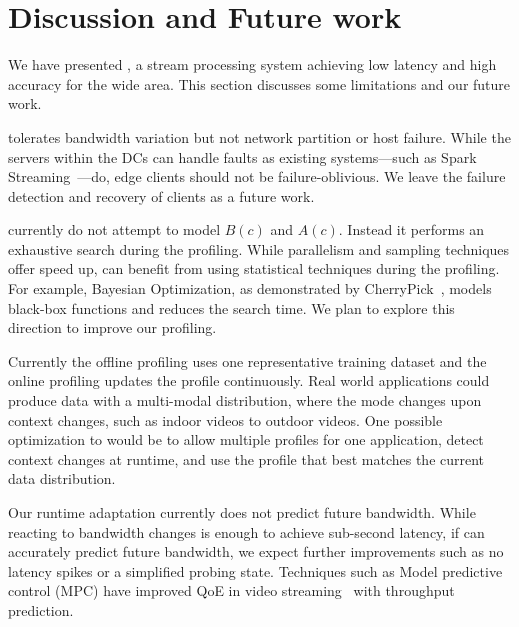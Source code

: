 \section{Discussion and Future work}
\label{sec:discussion}

We have presented \sysname{}, a stream processing system achieving low latency
and high accuracy for the wide area. This section discusses some limitations and
our future work.

 \sysname{} tolerates bandwidth
variation but not network partition or host failure. While the servers within
the DCs can handle faults as existing systems---such as Spark
Streaming~\cite{zaharia2013discretized}---do, edge clients should not be
failure-oblivious. We leave the failure detection and recovery of clients as a
future work.

 \sysname{} currently do not attempt to model $B(c)$
and $A(c)$. Instead it performs an exhaustive search during the profiling. While
parallelism and sampling techniques offer speed up, \sysname{} can benefit from
using statistical techniques during the profiling. For example, Bayesian
Optimization, as demonstrated by CherryPick~\cite{alipourfard2017cherrypick},
models black-box functions and reduces the search time. We plan to explore this
direction to improve our profiling.


 Currently the offline profiling uses one
representative training dataset and the online profiling updates the profile
continuously. Real world applications could produce data with a multi-modal
distribution, where the mode changes upon context changes, such as indoor videos
to outdoor videos. One possible optimization to \sysname{} would be to allow multiple profiles
for one application, detect context changes at runtime, and use the profile that
best matches the current data distribution.

 Our runtime adaptation currently does not
predict future bandwidth. While reacting to bandwidth changes is enough to
achieve sub-second latency, if \sysname{} can accurately predict future
bandwidth, we expect further improvements such as no latency spikes or a
simplified probing state. Techniques such as Model predictive control (MPC) have
improved QoE in video streaming~\cite{yin2015control} with throughput
prediction.

